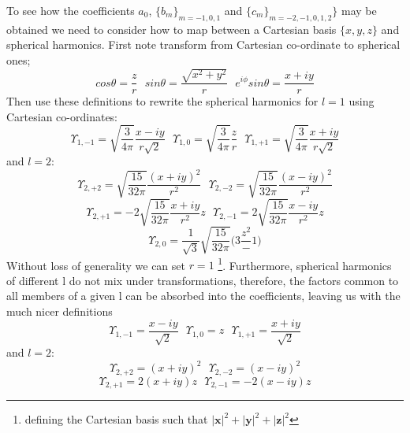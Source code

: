 \documentclass[12pt]{article}
\begin{document}
\noindent To see how the coefficients $a_{0}$, $\{b_{m}\}_{m=-1,0,1}$ and 
 $\{c_{m}\}_{m=-2,-1,0,1,2}\}$ may be
obtained we need to consider how to map between a Cartesian basis $\{x,y,z\}$
and spherical harmonics. First note transform from Cartesian co-ordinate to 
spherical ones; 
\begin{equation}
cos \theta = \frac{z}{r} \text{\ \ \ }
sin \theta = \frac{\sqrt{x^{2}+y^{2}}}{r} \text{\ \ \ }
e^{i\phi} sin\theta  = \frac{x+iy}{r} 
\end{equation}
\noindent Then use these definitions to rewrite the spherical harmonics for
$l=1$ using Cartesian co-ordinates:
\begin{equation}
\Upsilon_{1,-1} = \sqrt{\frac{3}{4\pi}}\frac{x-iy}{r\sqrt{2}} \text{\ \ \ }
\Upsilon_{1,0} = \sqrt{\frac{3}{4\pi}}\frac{z}{r} \text{\ \ \ }
\Upsilon_{1,+1} = \sqrt{\frac{3}{4\pi}}\frac{x+iy}{r\sqrt{2}}
\end{equation}
and $l=2$:
\begin{equation*}
\Upsilon_{2,+2} = \sqrt{\frac{15}{32\pi}}\frac{(x+iy)^{2}}{r^{2}} \text{\ \ \ }
\Upsilon_{2,-2} = \sqrt{\frac{15}{32\pi}}\frac{(x-iy)^{2}}{r^{2}}
\end{equation*}
\begin{equation*}
\Upsilon_{2,+1} = -2\sqrt{\frac{15}{32\pi}}\frac{x+iy}{r^{2}}z \text{\ \ \ }
\Upsilon_{2,-1} = 2\sqrt{\frac{15}{32\pi}}\frac{x-iy}{r^{2}}z
 \end{equation*}
\begin{equation}
\Upsilon_{2,0} = \frac{1}{\sqrt{3}}
 \sqrt{\frac{15}{32\pi}}\Bigg( 3 \frac{z^{2}} -1 \Bigg )
\end{equation}
\noindent Without loss of generality we can set $r=1$ 
\footnote{defining the Cartesian basis such that $|\mathbf{x}|^{2}+|\mathbf{y}|^{2}+|\mathbf{z}|^{2}$ }. Furthermore, spherical harmonics of different 
l do not mix under transformations, therefore, the factors common to
all members of a given l can be absorbed into the coefficients, leaving 
us with the much nicer definitions
\begin{equation}
\Upsilon_{1,-1} = \frac{x-iy}{\sqrt{2}} \text{\ \ \ }
\Upsilon_{1,0}  = z \text{\ \ \ }
\Upsilon_{1,+1} = \frac{x+iy}{\sqrt{2}}
\end{equation}
and $l=2$:
\begin{equation*}
\Upsilon_{2,+2} = (x+iy)^{2}\text{\ \ \ }
\Upsilon_{2,-2} = (x-iy)^{2}
\end{equation*}
\begin{equation*}
\Upsilon_{2,+1} = 2(x+iy)z \text { \ \ \ }
\Upsilon_{2,-1} = -2(x-iy)z 
\end{equation*}
\end{document}
